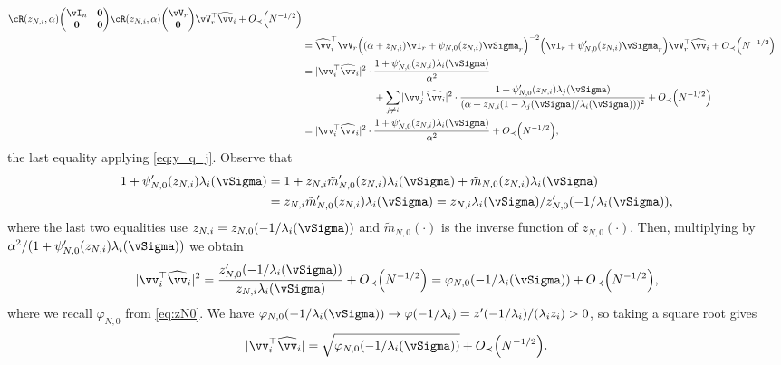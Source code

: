 \begin{proof-of-theorem}
\begin{align}
\vcR(z_{N,i},\alpha) \begin{pmatrix} \vI_n & \mathbf{0} \\
\mathbf{0} & \mathbf{0} \end{pmatrix} 
\vcR(z_{N,i},\alpha) \begin{pmatrix} \vV_r \\ \mathbf{0} \end{pmatrix}
\vV_r^\top \widehat\vv_i+\SD{N^{-1/2}}\notag\\
&=\widehat\vv_i^\top \vV_r
\Big((\alpha+z_{N,i})\vI_r+\psi_{N,0}(z_{N,i})\vSigma_r\Big)^{-2}
\Big(\vI_r+\psi_{N,0}'(z_{N,i})\vSigma_r\Big) \vV_r^\top \widehat\vv_i
+\SD{N^{-1/2}}\notag\\
&=|\vv^\top_i\widehat{\vv}_i|^2\cdot\frac{1+\psi_{N,0}'(z_{N,i})\lambda_i(\vSigma)}{\alpha^2}\notag\\
&\hspace{1in}+\sum_{j\neq
i} |\vv^\top_j\widehat{\vv}_i|^2
\cdot\frac{1+\psi_{N,0}'(z_{N,i})\lambda_j(\vSigma)}{(\alpha+z_{N,i}(1-\lambda_j(\vSigma)/\lambda_i(\vSigma)))^2}+\SD{N^{-1/2}}\notag\\
&=
|\vv^\top_i\widehat{\vv}_i|^2\cdot\frac{1+\psi_{N,0}'(z_{N,i})\lambda_i(\vSigma)}{\alpha^2}+\SD{N^{-1/2}}, \label{eq:x-y}
	\end{align}
	the last equality applying \eqref{eq:y_q_j}.
Observe that
\begin{align*}
1+\psi_{N,0}'(z_{N,i})\lambda_i(\vSigma)
&=1+z_{N,i}\tilde m_{N,0}'(z_{N,i})\lambda_i(\vSigma)
+\tilde m_{N,0}(z_{N,i})\lambda_i(\vSigma)\\
&=z_{N,i}\tilde m_{N,0}'(z_{N,i})\lambda_i(\vSigma)
=z_{N,i}\lambda_i(\vSigma)/z_{N,0}'(-1/\lambda_i(\vSigma)),
\end{align*}
where the last two equalities use $z_{N,i}=z_{N,0}(-1/\lambda_i(\vSigma))$
and $\tilde m_{N,0}(\cdot)$ is the inverse function of $z_{N,0}(\cdot)$.
Then, multiplying by $\alpha^2/(1+\psi_{N,0}'(z_{N,i})\lambda_i(\vSigma))$
we obtain
\[|\vv^\top_i\widehat{\vv}_i|^2=\frac{z_{N,0}'(-1/\lambda_i(\vSigma))}
{z_{N,i}\lambda_i(\vSigma)}+\SD{N^{-1/2}}
=\varphi_{N,0}({-}1/\lambda_i(\vSigma))+\SD{N^{-1/2}},\]
where we recall $\varphi_{N,0}$ from \eqref{eq:zN0}.
We have $\varphi_{N,0}(-1/\lambda_i(\vSigma)) \to \varphi(-1/\lambda_i)
=z'(-1/\lambda_i)/(\lambda_iz_i)>0$, so taking a square root gives
\begin{equation}\label{eq:vivhati}
|\vv^\top_i\widehat{\vv}_i|=\sqrt{\varphi_{N,0}({-}1/\lambda_i(\vSigma))}
+\SD{N^{-1/2}}.
\end{equation}


\end{proof-of-theorem}
